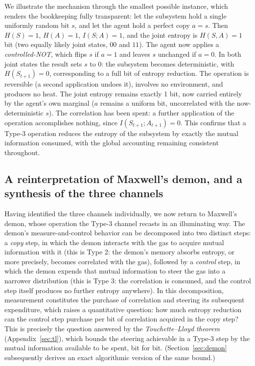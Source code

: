 \documentclass[11pt]{article}
\begin{document}
\begin{example}
\label{ex:cnot}
We illustrate the mechanism through the smallest possible instance, which renders the bookkeeping fully transparent: let the subsystem hold a single uniformly random bit $s$, and let the agent hold a perfect copy $a = s$. Then $H(S) = 1$, $H(A) = 1$, $I(S;A) = 1$, and the joint entropy is $H(S, A) = 1$ bit (two equally likely joint states, $00$ and $11$). The agent now applies a \emph{controlled-NOT}, which flips $s$ if $a = 1$ and leaves $s$ unchanged if $a = 0$. In both joint states the result sets $s$ to $0$: the subsystem becomes deterministic, with $H(S_{t+1}) = 0$, corresponding to a full bit of entropy reduction. The operation is reversible (a second application undoes it), involves no environment, and produces no heat. The joint entropy remains exactly 1 bit, now carried entirely by the agent's own marginal ($a$ remains a uniform bit, uncorrelated with the now-deterministic $s$). The correlation has been spent: a further application of the operation accomplishes nothing, since $I(S_{t+1}; A_{t+1}) = 0$. This confirms that a Type-3 operation reduces the entropy of the subsystem by exactly the mutual information consumed, with the global accounting remaining consistent throughout.
\end{example}

\subsection{A reinterpretation of Maxwell's demon, and a synthesis of the three channels}
\label{sec:demonreframe}

Having identified the three channels individually, we now return to Maxwell's demon, whose operation the Type-3 channel recasts in an illuminating way. The demon's measure-and-control behavior can be decomposed into two distinct steps: a \emph{copy} step, in which the demon interacts with the gas to acquire mutual information with it (this is Type 2: the demon's memory absorbs entropy, or more precisely, becomes correlated with the gas), followed by a \emph{control} step, in which the demon expends that mutual information to steer the gas into a narrower distribution (this is Type 3: the correlation is consumed, and the control step itself produces no further entropy anywhere). In this decomposition, measurement constitutes the purchase of correlation and steering its subsequent expenditure, which raises a quantitative question: how much entropy reduction can the control step purchase per bit of correlation acquired in the copy step? This is precisely the question answered by the \emph{Touchette--Lloyd theorem} (Appendix~\ref{sec:tl}), which bounds the steering achievable in a Type-3 step by the mutual information available to be spent, bit for bit. (Section~\ref{sec:demon} subsequently derives an exact algorithmic version of the same bound.)
\end{document}
